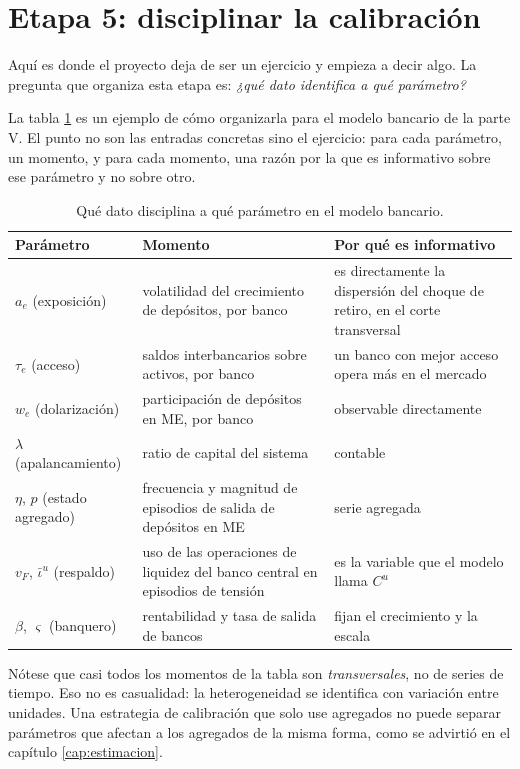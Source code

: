 \section{Etapa 5: disciplinar la calibración}

Aquí es donde el proyecto deja de ser un ejercicio y empieza a decir algo. La
pregunta que organiza esta etapa es: \emph{¿qué dato identifica a qué parámetro?}

La tabla \ref{tab:identificacion} es un ejemplo de cómo organizarla para el
modelo bancario de la parte V. El punto no son las entradas concretas sino el
ejercicio: para cada parámetro, un momento, y para cada momento, una razón por la
que es informativo sobre ese parámetro y no sobre otro.

\begin{table}[htbp]
\centering\small\setlength{\tabcolsep}{4pt}
\caption{Qué dato disciplina a qué parámetro en el modelo bancario.}
\label{tab:identificacion}
\begin{tabular}{@{}p{}p{}p{}@{}}
\toprule
\textbf{Parámetro} & \textbf{Momento} & \textbf{Por qué es informativo}\\
\midrule
$a_e$ (exposición) & volatilidad del crecimiento de depósitos, por banco &
es directamente la dispersión del choque de retiro, en el corte transversal\\
$\tau_e$ (acceso) & saldos interbancarios sobre activos, por banco &
un banco con mejor acceso opera más en el mercado\\
$w_e$ (dolarización) & participación de depósitos en ME, por banco &
observable directamente\\
$\lambda$ (apalancamiento) & ratio de capital del sistema & contable\\
$\eta$, $p$ (estado agregado) & frecuencia y magnitud de episodios de salida de
depósitos en ME & serie agregada\\
$v_F$, $\bar\iota^u$ (respaldo) & uso de las operaciones de liquidez del banco
central en episodios de tensión & es la variable que el modelo llama $C^u$\\
$\beta$, $\varsigma$ (banquero) & rentabilidad y tasa de salida de bancos &
fijan el crecimiento y la escala\\
\bottomrule
\end{tabular}
\end{table}

\begin{idea}
Nótese que casi todos los momentos de la tabla son \emph{transversales}, no de
series de tiempo. Eso no es casualidad: la heterogeneidad se identifica con
variación entre unidades. Una estrategia de calibración que solo use agregados no
puede separar parámetros que afectan a los agregados de la misma forma, como se
advirtió en el capítulo \ref{cap:estimacion}.
\end{idea}

